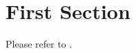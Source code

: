 \documentclass[template=aiaa-journal]{nasa-latex-docs}
\begin{document}
\section{First Section}

Please refer to \cite{Template-Guide}.
\end{document}
